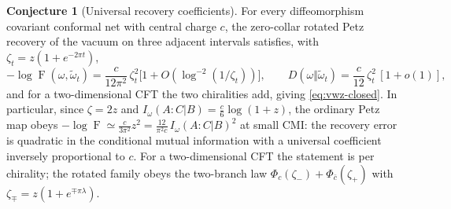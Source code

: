 \documentclass[11pt]{article}
\theoremstyle{accent}
\theoremstyle{definition}
\newcommand{\Fid}{\operatorname{F}}
\newtheorem{conjecture}[theorem]{Conjecture}
\begin{document}
\begin{conjecture}[Universal recovery coefficients]\label{conj:universal}
For every diffeomorphism covariant conformal net with central charge \(c\), the zero-collar rotated Petz recovery of the vacuum on three adjacent intervals satisfies, with \(\zeta_t=z(1+e^{-2\pi t})\),
\[
 -\log\Fid(\omega,\widetilde\omega_t)=\frac{c}{12\pi^2}\,\zeta_t^2\bigl[1+O(\log^{-2}(1/\zeta_t))\bigr],\qquad
 D(\omega\Vert\widetilde\omega_t)=\frac{c}{12}\,\zeta_t^2\,[1+o(1)],
\]
and for a two-dimensional CFT the two chiralities add, giving \eqref{eq:vwz-closed}.  In particular, since \(\zeta=2z\) and \(I_\omega(A{:}C|B)=\frac c6\log(1+z)\), the ordinary Petz map obeys \(-\log\Fid\simeq\frac{c}{3\pi^2}z^2=\frac{12}{\pi^2c}\,I_\omega(A{:}C|B)^2\) at small CMI: the recovery error is quadratic in the conditional mutual information with a universal coefficient inversely proportional to \(c\).
  For a two-dimensional CFT the statement is per chirality; the rotated family obeys the two-branch law \(\Phi_c(\zeta_-)+\Phi_{\bar c}(\zeta_+)\) with \(\zeta_\mp=z(1+e^{\mp\pi\lambda})\).
\end{conjecture}
\end{document}
